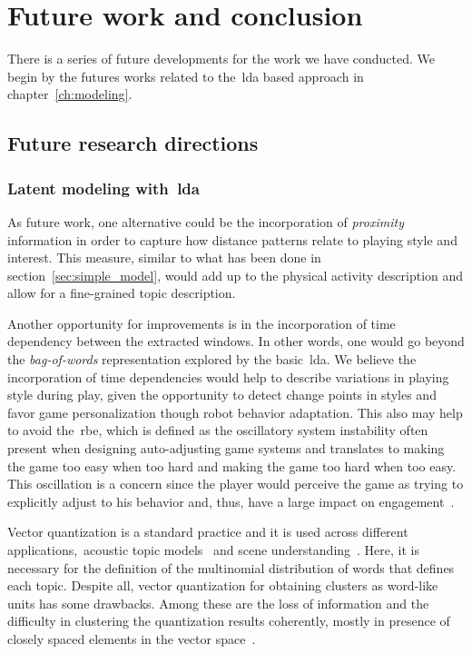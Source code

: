 \chapter{Future work and conclusion}\label{ch:future}

There is a series of future developments for the work we have conducted. We begin by the futures works related to the~\gls{lda} based approach in chapter~\ref{ch:modeling}.

\section{Future research directions}
\subsection{Latent modeling with~\glsdesc{lda}}\label{sec:future_lda}
As future work, one alternative could be the incorporation of \textit{proximity} information in order to capture how distance patterns relate to playing style and interest. This measure, similar to what has been done in section~\ref{sec:simple_model}, would add up to the physical activity description and allow for a fine-grained topic description.

Another opportunity for improvements is in the incorporation of time dependency between the extracted windows. In other words, one would go beyond the \textit{bag-of-words} representation explored by the basic~\gls{lda}. We believe the incorporation of time dependencies would help to describe variations in playing style during play, given the opportunity to detect change points in styles and favor game personalization though robot behavior adaptation. This also may help to avoid the~\gls{rbe}, which is defined as the oscillatory system instability often present when designing auto-adjusting game systems and translates to making the game too easy when too hard and making the game too hard when too easy. This oscillation is a concern since the player would perceive the game as trying to explicitly adjust to his behavior and, thus, have a large impact on engagement~\citep{martinoia_physically_2013}.

Vector quantization is a standard practice and it is used across different applications,~\eg acoustic topic models~\citep{kim_acoustic_2009,kim_audio_2009} and scene understanding~\citep{cao_spatially_2007,li_towards_2009,niu_context_2012}. Here, it is necessary for the definition of the multinomial distribution of words that defines each topic. Despite all, vector quantization for obtaining clusters as word-like units has some drawbacks. Among these are the loss of information and the difficulty in clustering the quantization results coherently, mostly in presence of closely spaced elements in the vector space~\citep{hu_latent_2012}.


